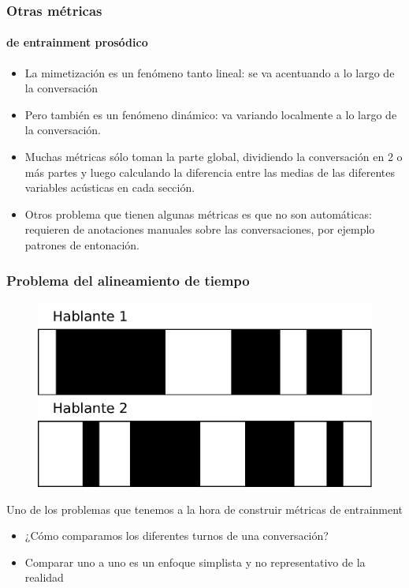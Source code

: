 \begin{frame}
  \frametitle{Otras métricas}
  \framesubtitle{de entrainment prosódico}
  \begin{itemize}
    \item La mimetización es un fenómeno tanto lineal: se va acentuando a lo largo de la conversación
    \item Pero también es un fenómeno dinámico: va variando localmente a lo largo de la conversación.
    \item Muchas métricas sólo toman la parte global, dividiendo la conversación en 2 o más partes y luego calculando la diferencia entre las medias de las diferentes variables acústicas en cada sección.
    \item Otros problema que tienen algunas métricas es que no son automáticas: requieren de anotaciones manuales sobre las conversaciones, por ejemplo patrones de entonación.
  \end{itemize}


\end{frame}


\begin{frame}
  \frametitle{Problema del alineamiento de tiempo}

  \begin{figure}[t]
    \includegraphics[scale=0.40]{images/conversation_turns.pdf}
  \end{figure}
  Uno de los problemas que tenemos a la hora de construir métricas de entrainment

  \begin{itemize}
    \item ¿Cómo comparamos los diferentes turnos de una conversación?
    \item Comparar uno a uno es un enfoque simplista y no representativo de la realidad
  \end{itemize}
\end{frame}

